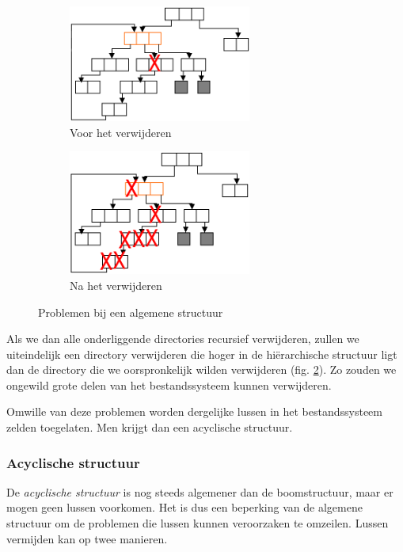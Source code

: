 \begin{figure}
\centering
\begin{subfigure}{.5\textwidth}
  \centering
  \includegraphics[width=60mm]{images/fig0404a.png}
  \caption{Voor het verwijderen}
  \label{problalg2:a}
\end{subfigure}%
\begin{subfigure}{.5\textwidth}
  \centering
  \includegraphics[width=60mm]{images/fig0404b.png}
  \caption{Na het verwijderen}
  \label{problalg2:b}
\end{subfigure}
\caption{Problemen bij een algemene structuur}
\label{problalg2}
\end{figure}


Als we dan alle onderliggende directories recursief
verwijderen, zullen we uiteindelijk een directory verwijderen die
hoger in de hi\"erarchische structuur ligt dan de directory die we
oorspronkelijk wilden verwijderen (fig. \ref{problalg2:b}). Zo zouden we ongewild grote delen
van het bestandssysteem kunnen verwijderen.

Omwille van deze problemen worden dergelijke lussen in het
bestandssysteem zelden toegelaten. Men krijgt dan een acyclische
structuur.

\subsubsection{Acyclische structuur}

De \emph{acyclische structuur} is nog steeds
algemener dan de boomstructuur, maar er mogen geen lussen voorkomen.
Het is dus een beperking van de algemene structuur om de problemen
die lussen kunnen veroorzaken te omzeilen. Lussen vermijden kan op
twee manieren.

